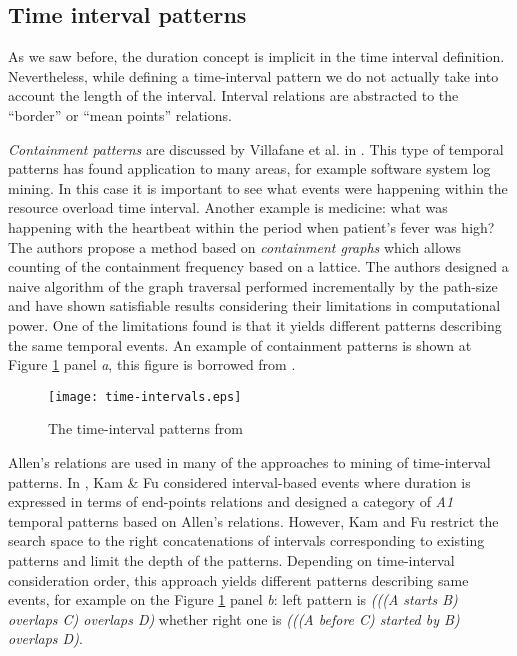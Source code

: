 \subsection{Time interval patterns}
As we saw before, the duration concept is implicit in the time interval definition. Nevertheless, while defining a time-interval pattern we do not actually take into account the length of the interval. Interval relations are abstracted to the ``border'' or ``mean points'' relations.

\textit{Containment patterns} are discussed by Villafane et al. in \cite{citeulike:2804633}. This type of temporal patterns has found application to many areas, for example software system log mining. In this case it is important to see what events were happening within the resource overload time interval. Another example is medicine: what was happening with the heartbeat within the period when patient's fever was high? The authors propose a method based on \textit{containment graphs} which allows counting of the containment frequency based on a lattice. The authors designed a naive algorithm of the graph traversal performed incrementally by the path-size and have shown satisfiable results considering their limitations in computational power. One of the limitations found is that it yields different patterns describing the same temporal events. An example of containment patterns is shown at Figure \ref{fig:timeintervals} panel \textit{a}, this figure is borrowed from \cite{citeulike:1748833}.

\begin{figure}[tbp]
   \centering
   \texttt{[image: time-intervals.eps]}
   \caption{The time-interval patterns from \cite{citeulike:1748833}}
   \label{fig:timeintervals}
\end{figure}

Allen's relations are used in many of the approaches to mining of time-interval patterns. In \cite{citeulike:5159362}, Kam \& Fu considered interval-based events where duration is expressed in terms of end-points relations and designed a category of \textit{A1} temporal patterns based on Allen's relations. However, Kam and Fu restrict the search space to the right concatenations of intervals corresponding to existing patterns and limit the depth of the patterns. Depending on time-interval consideration order, this approach yields different patterns describing same events, for example on the Figure \ref{fig:timeintervals} panel \textit{b}: left pattern is \textit{(((A starts B) overlaps C) overlaps D)} whether right one is \textit{(((A before C) started by B) overlaps D)}.

